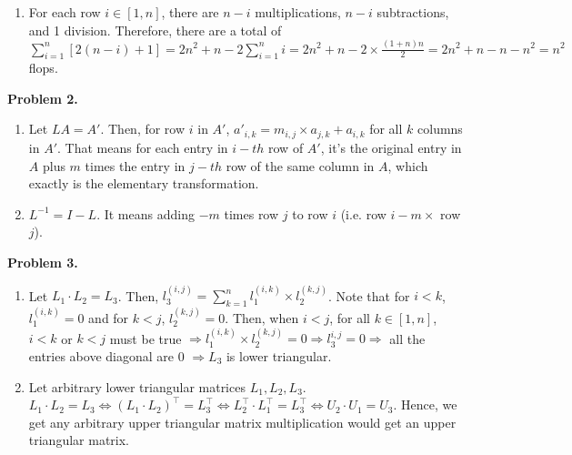 \documentclass{article}
\begin{document}
\begin{enumerate}[label={\alph*)}]
    \item
    For each row $i \in [1,n]$, there are $n-i$ multiplications, $n-i$ subtractions, and 1 division.
    Therefore, there are a total of $\sum\limits_{i=1}^n[2(n-i) + 1] = 2n^2 + n -2\sum\limits_{i=1}^{n}i=2n^2+n-2\times\frac{(1+n)n}{2} = 2n^2+n-n-n^2=n^2$ flops.
\end{enumerate}
\bigbreak

\textbf{Problem 2.}
\begin{enumerate}[label={\alph*)}]
    \item 
    Let $LA = A'$.
    Then, for row $i$ in $A'$, $a'_{i,k} = m_{i,j}\times a_{j,k} + a_{i,k}$ for all $k$ columns in $A'$.
    That means for each entry in $i-th$ row of $A'$, it's the original entry in $A$ plus $m$ times the entry in $j-th$ row of the same column in $A$, which exactly is the elementary transformation.

    \item
    $L^{-1} = I-L$. It means adding $-m$ times row $j$ to row $i$ (i.e. row $i - m\times$ row $j$).
\end{enumerate}
\bigbreak

\textbf{Problem 3.}
\begin{enumerate}[label={\alph*)}]
    \item 
    Let $L_1 \cdot L_2 = L_3$.
    Then, $l_3^{(i, j)} = \sum\limits_{k=1}^{n}l_1^{(i,k)}\times l_2^{(k,j)}$. Note that for $i < k$, $l_1^{(i,k)} = 0$ and for $k < j$, $l_2^{(k,j)} = 0$.
    Then, when $i < j$, for all $k\in [1,n]$, $i<k$ or $k<j$ must be true $\Rightarrow l_1^{(i,k)}\times l_2^{(k,j)}=0 \Rightarrow l_3^{i,j} = 0 \Rightarrow$  all the entries above diagonal are 0 $\Rightarrow L_3$ is lower triangular.

    \item 
    Let arbitrary lower triangular matrices $L_1, L_2, L_3$. $L_1 \cdot L_2 = L_3 \Leftrightarrow (L_1\cdot L_2)^\top = L_3^\top \Leftrightarrow L_2^\top \cdot L_1^\top = L_3^\top \Leftrightarrow U_2 \cdot U_1 = U_3$.
    Hence, we get any arbitrary upper triangular matrix multiplication would get an upper triangular matrix.
\end{enumerate}
\bigbreak
\end{document}
